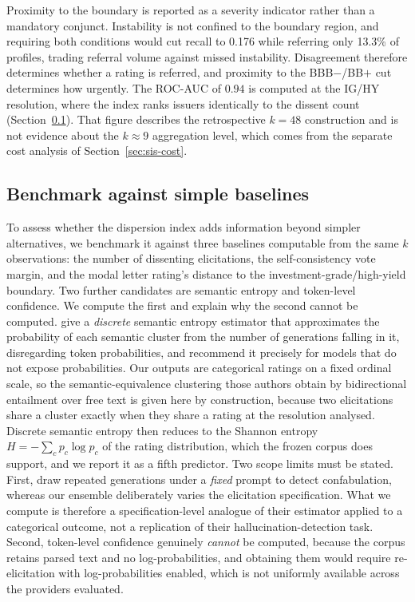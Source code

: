 \documentclass[a4paper,fleqn]{cas-sc}
\begin{document}
Proximity to the boundary is reported as a severity indicator rather than a mandatory conjunct.
Instability is not confined to the boundary region, and requiring both conditions would cut recall
to 0.176 while referring only 13.3\% of profiles, trading referral volume against missed
instability. Disagreement therefore determines whether a rating is referred, and proximity to the
BBB$-$/BB$+$ cut determines how urgently. The ROC-AUC of $0.94$ is computed at the IG/HY
resolution, where the index ranks issuers identically to the dissent count
(Section~\ref{sec:sis-baselines}). That figure describes the retrospective $k=48$ construction and is not evidence about the
$k\approx9$ aggregation level, which comes from the separate cost analysis of
Section~\ref{sec:sis-cost}.

\subsection{Benchmark against simple baselines}\label{sec:sis-baselines}
To assess whether the dispersion index adds information beyond simpler alternatives, we benchmark
it against three baselines computable from the same $k$ observations: the number of dissenting
elicitations, the self-consistency vote margin, and the modal letter rating's distance to the
investment-grade/high-yield boundary. Two further candidates are semantic entropy and token-level confidence. We compute the first and explain why the second cannot be computed. \citet{farquhar2024semantic} give a \emph{discrete} semantic
entropy estimator that approximates the probability of each semantic cluster from the number of
generations falling in it, disregarding token probabilities, and recommend it precisely for models
that do not expose probabilities. Our outputs are categorical ratings on a fixed ordinal scale, so
the semantic-equivalence clustering those authors obtain by bidirectional entailment over free text
is given here by construction, because two elicitations share a cluster exactly when they share a rating at
the resolution analysed. Discrete semantic entropy then reduces to the Shannon entropy
$H=-\sum_c p_c\log p_c$ of the rating distribution, which the frozen corpus does support, and we
report it as a fifth predictor. Two scope limits must be stated. First,
\citet{farquhar2024semantic} draw repeated generations under a \emph{fixed} prompt to detect
confabulation, whereas our ensemble deliberately varies the elicitation specification. What we
compute is therefore a specification-level analogue of their estimator applied to a categorical
outcome, not a replication of their hallucination-detection task. Second, token-level confidence
genuinely \emph{cannot} be computed, because the corpus retains parsed text and no log-probabilities, and
obtaining them would require re-elicitation with log-probabilities enabled, which is not uniformly
available across the providers evaluated.
\end{document}
